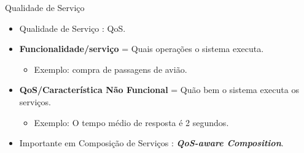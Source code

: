 \documentclass[xcolor=svgnames]{beamer}
\begin{document}
    \begin{frame}{Qualidade de Serviço}
        \begin{itemize}
          \item Qualidade de Serviço : QoS.
          \item \textbf{Funcionalidade/serviço} = Quais operações o sistema executa.
                \begin{itemize}
                    \item Exemplo: compra de passagens de avião.
                \end{itemize}

          \item \textbf{QoS/Característica Não Funcional} = Quão bem o sistema executa os serviços.
                \begin{itemize}
                    \item Exemplo: O tempo médio de resposta é 2 segundos.
                \end{itemize}
          \item Importante em Composição de Serviços : \textbf{\emph{QoS-aware Composition}}.
        \end{itemize}
  \end{frame}
\end{document}
